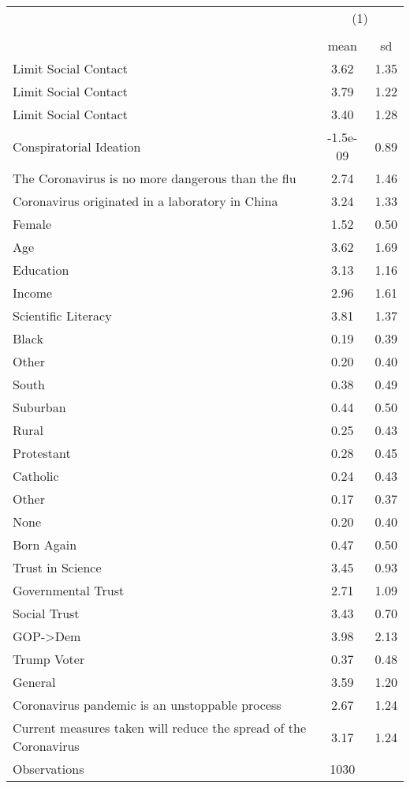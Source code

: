 {
\def\sym#1{\ifmmode^{#1}\else\(^{#1}\)\fi}
\begin{tabular}{l*{1}{cc}}
\hline\hline
                    &\multicolumn{2}{c}{(1)}  \\
                    &\multicolumn{2}{c}{}     \\
                    &        mean&          sd\\
\hline
Limit Social Contact&        3.62&        1.35\\
Limit Social Contact&        3.79&        1.22\\
Limit Social Contact&        3.40&        1.28\\
Conspiratorial Ideation&    -1.5e-09&        0.89\\
The Coronavirus is no more dangerous than the flu&        2.74&        1.46\\
Coronavirus originated in a laboratory in China&        3.24&        1.33\\
Female              &        1.52&        0.50\\
Age                 &        3.62&        1.69\\
Education           &        3.13&        1.16\\
Income              &        2.96&        1.61\\
Scientific Literacy &        3.81&        1.37\\
Black               &        0.19&        0.39\\
Other               &        0.20&        0.40\\
South               &        0.38&        0.49\\
Suburban            &        0.44&        0.50\\
Rural               &        0.25&        0.43\\
Protestant          &        0.28&        0.45\\
Catholic            &        0.24&        0.43\\
Other               &        0.17&        0.37\\
None                &        0.20&        0.40\\
Born Again          &        0.47&        0.50\\
Trust in Science    &        3.45&        0.93\\
Governmental Trust  &        2.71&        1.09\\
Social Trust        &        3.43&        0.70\\
GOP->Dem            &        3.98&        2.13\\
Trump Voter         &        0.37&        0.48\\
General             &        3.59&        1.20\\
Coronavirus pandemic is an unstoppable process&        2.67&        1.24\\
Current measures taken will reduce the spread of the Coronavirus&        3.17&        1.24\\
\hline
Observations        &        1030&            \\
\hline\hline
\end{tabular}
}
